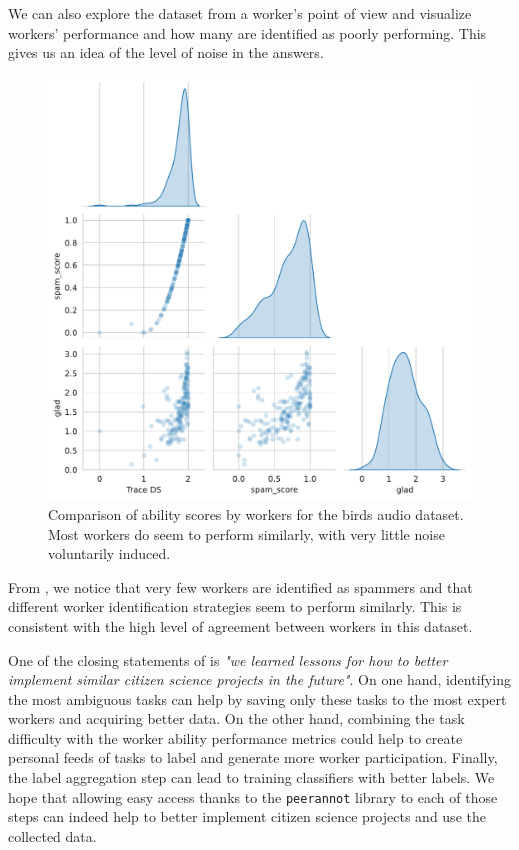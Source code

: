 We can also explore the dataset from a worker's point of view and visualize workers' performance and how many are identified as poorly performing.
This gives us an idea of the level of noise in the answers.

\begin{figure}[tbh]
    \centering
    \includegraphics[width=.85\textwidth]{./images_peerannot/fig-abilitiesbird-output-1.pdf}
    \caption{Comparison of ability scores by workers for the birds audio dataset. Most workers do seem to perform similarly, with very little noise voluntarily induced.
    }
    \label{fig:abilitiesbirds}
\end{figure}

From , we notice that very few workers are identified as spammers and that different worker identification strategies seem to perform similarly.
This is consistent with the high level of agreement between workers in this dataset.

One of the closing statements of \citet{lehikoinen2023successful} is \emph{"we learned lessons for how to better implement similar citizen science projects in the future"}.
On one hand, identifying the most ambiguous tasks can help by saving only these tasks to the most expert workers and acquiring better data.
On the other hand, combining the task difficulty with the worker ability performance metrics could help to create personal feeds of tasks to label and generate more worker participation.
Finally, the label aggregation step can lead to training classifiers with better labels.
We hope that allowing easy access thanks to the \texttt{peerannot} library to each of those steps can indeed help to better implement citizen science projects and use the collected data.

